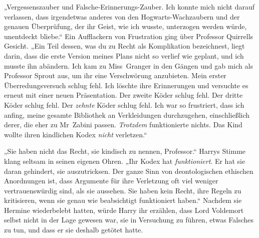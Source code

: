 „Vergessenszauber und Falsche-Erinnerungs-Zauber. Ich konnte mich nicht darauf verlassen, dass irgendetwas anderes von den Hogwarts-Wachzaubern und der genauen Überprüfung, der ihr Geist, wie ich wusste, unterzogen werden würde, unentdeckt bliebe.“
Ein Aufflackern von Frustration ging über Professor Quirrells Gesicht.
„Ein Teil dessen, was du zu Recht als Komplikation bezeichnest, liegt darin, dass die erste Version meines Plans nicht so verlief wie geplant, und ich musste ihn abändern. Ich kam zu Miss~Granger in den Gängen und gab mich als Professor Sprout aus, um ihr eine Verschwörung anzubieten. Mein erster Überredungsversuch schlug fehl. Ich löschte ihre Erinnerungen und versuchte es erneut mit einer neuen Präsentation. Der zweite Köder schlug fehl. Der dritte Köder schlug fehl. Der \emph{zehnte} Köder schlug fehl. Ich war so frustriert, dass ich anfing, meine gesamte Bibliothek an Verkleidungen durchzugehen, einschließlich derer, die eher zu Mr~Zabini passen. \emph{Trotzdem} funktionierte nichts. Das Kind wollte ihren kindlichen Kodex \emph{nicht} verletzen.“

„Sie haben nicht das Recht, sie kindisch zu nennen, Professor.“
Harrys Stimme klang seltsam in seinen eigenen Ohren.
„Ihr Kodex hat \emph{funktioniert}. Er hat sie daran gehindert, sie auszutricksen. Der ganze Sinn von deontologischen ethischen Anordnungen ist, dass Argumente für ihre Verletzung oft viel weniger vertrauenswürdig sind, als sie aussehen. Sie haben kein Recht, ihre Regeln zu kritisieren, wenn sie genau wie beabsichtigt funktioniert haben.“
Nachdem sie Hermine wiederbelebt hatten, würde Harry ihr erzählen, dass Lord Voldemort selbst nicht in der Lage gewesen war, sie in Versuchung zu führen, etwas Falsches zu tun, und dass er sie deshalb getötet hatte.


